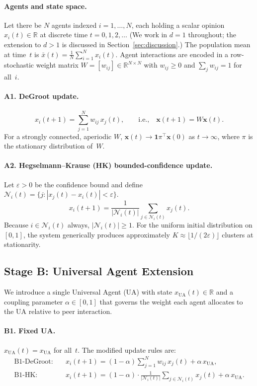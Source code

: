 \documentclass{article}
\theoremstyle{plain}
\theoremstyle{definition}
\theoremstyle{remark}
\newcommand{\bx}{\mathbf{x}}
\newcommand{\bone}{\mathbf{1}}
\newcommand{\xUA}{x_{\mathrm{UA}}}
\newcommand{\xbar}{\bar{x}}
\newcommand{\Ni}{\mathcal{N}_i}
\begin{document}
\paragraph{Agents and state space.}
Let there be $N$ agents indexed $i = 1,\ldots,N$, each holding a scalar
opinion $x_i(t)\in\mathbb{R}$ at discrete time $t=0,1,2,\ldots$
(We work in $d=1$ throughout; the extension to $d>1$ is discussed in
Section~\ref{sec:discussion}.)
The population mean at time~$t$ is $\xbar(t) = \frac{1}{N}\sum_{i=1}^N x_i(t)$.
Agent interactions are encoded in a row-stochastic weight matrix
$W=[w_{ij}]\in\mathbb{R}^{N\times N}$ with $w_{ij}\geq 0$ and
$\sum_j w_{ij}=1$ for all~$i$.

\paragraph{A1. DeGroot update.}
\begin{equation}
    x_i(t+1) = \sum_{j=1}^{N} w_{ij}\,x_j(t),
    \qquad
    \text{i.e.,}\quad \bx(t+1) = W\bx(t).
    \label{eq:degroot}
\end{equation}
For a strongly connected, aperiodic $W$, $\bx(t)\to\bone\pi^\top\bx(0)$
as $t\to\infty$, where $\pi$ is the stationary distribution of~$W$.

\paragraph{A2. Hegselmann--Krause (HK) bounded-confidence update.}
Let $\varepsilon>0$ be the confidence bound and define
$\Ni(t)=\{j:|x_j(t)-x_i(t)|<\varepsilon\}$.
\begin{equation}
    x_i(t+1) = \frac{1}{|\Ni(t)|}\sum_{j\in\Ni(t)} x_j(t).
    \label{eq:hk}
\end{equation}
Because $i\in\Ni(t)$ always, $|\Ni(t)|\geq 1$.
For the uniform initial distribution on $[0,1]$, the system generically
produces approximately $K\approx\lfloor 1/(2\varepsilon)\rfloor$ clusters
at stationarity.

\subsection{Stage B: Universal Agent Extension}

We introduce a single Universal Agent (UA) with state $\xUA(t)\in\mathbb{R}$
and a coupling parameter $\alpha\in[0,1]$ that governs the weight each
agent allocates to the UA relative to peer interaction.

\paragraph{B1. Fixed UA.}
$\xUA(t) = \xUA$ for all~$t$. The modified update rules are:
\begin{align}
    \text{B1-DeGroot:}&\quad
    x_i(t+1) = (1-\alpha)\sum_{j=1}^N w_{ij}\,x_j(t) + \alpha\,\xUA,
    \label{eq:b1degroot}\\
    \text{B1-HK:}&\quad
    x_i(t+1) = (1-\alpha)\cdot\frac{1}{|\Ni(t)|}\sum_{j\in\Ni(t)} x_j(t)
               + \alpha\,\xUA.
    \label{eq:b1hk}
\end{align}
\end{document}
